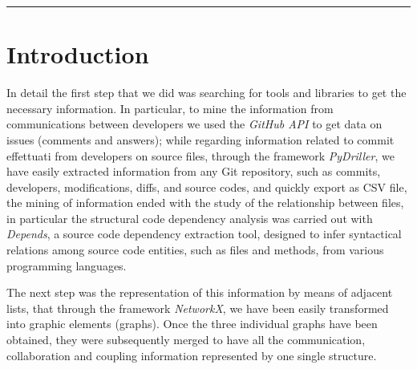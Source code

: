 \documentclass[sigconf]{acmart}
\begin{document}


\begin{teaserfigure}
\rule{\linewidth}{1mm}
\end{teaserfigure}

\maketitle

\section{Introduction}
In detail the first step that we did was searching for tools and libraries to get the necessary information. In particular, to mine the information from communications between developers we used the {\itshape GitHub API }to get data on issues (comments and answers); while regarding information related to commit effettuati from developers on source files, through the framework {\itshape PyDriller}, we have easily extracted information from any Git repository, such as commits, developers, modifications, diffs, and source codes, and quickly export as CSV file, the mining of information ended with the study of the relationship between files, in particular the structural code dependency analysis was carried out with {\itshape Depends}, a source code dependency extraction tool, designed to infer syntactical relations among source code entities, such as files and methods, from various programming languages.

The next step was the representation of this information by means of adjacent lists, that through the framework {\itshape NetworkX}, we have been easily transformed into graphic elements (graphs). Once the three individual graphs have been obtained, they were subsequently merged to have all the communication, collaboration and coupling information represented by one single structure. 
\end{document}
